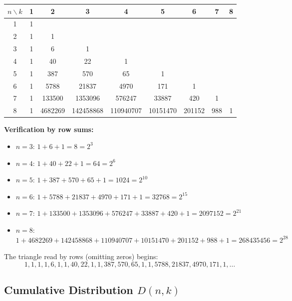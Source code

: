 \documentclass[11pt,a4paper]{article}
\theoremstyle{definition}
\begin{document}
\begin{center}
\begin{tabular}{c|cccccccc}
\toprule
$n \backslash k$ & 1 & 2 & 3 & 4 & 5 & 6 & 7 & 8 \\
\midrule
1 & 1 & & & & & & & \\
2 & 1 & 1 & & & & & & \\
3 & 1 & 6 & 1 & & & & & \\
4 & 1 & 40 & 22 & 1 & & & & \\
5 & 1 & 387 & 570 & 65 & 1 & & & \\
6 & 1 & 5788 & 21837 & 4970 & 171 & 1 & & \\
7 & 1 & 133500 & 1353096 & 576247 & 33887 & 420 & 1 & \\
8 & 1 & 4682269 & 142458868 & 110940707 & 10151470 & 201152 & 988 & 1 \\
\bottomrule
\end{tabular}
\end{center}

\textbf{Verification by row sums:}
\begin{itemize}
\item $n = 3$: $1 + 6 + 1 = 8 = 2^3$ \checkmark
\item $n = 4$: $1 + 40 + 22 + 1 = 64 = 2^6$ \checkmark
\item $n = 5$: $1 + 387 + 570 + 65 + 1 = 1024 = 2^{10}$ \checkmark
\item $n = 6$: $1 + 5788 + 21837 + 4970 + 171 + 1 = 32768 = 2^{15}$ \checkmark
\item $n = 7$: $1 + 133500 + 1353096 + 576247 + 33887 + 420 + 1 = 2097152 = 2^{21}$ \checkmark
\item $n = 8$: $1 + 4682269 + 142458868 + 110940707 + 10151470 + 201152 + 988 + 1 = 268435456 = 2^{28}$ \checkmark
\end{itemize}

The triangle read by rows (omitting zeros) begins:
\[
1, 1, 1, 1, 6, 1, 1, 40, 22, 1, 1, 387, 570, 65, 1, 1, 5788, 21837, 4970, 171, 1, \ldots
\]

\subsection{Cumulative Distribution $D(n, k)$}
\end{document}
